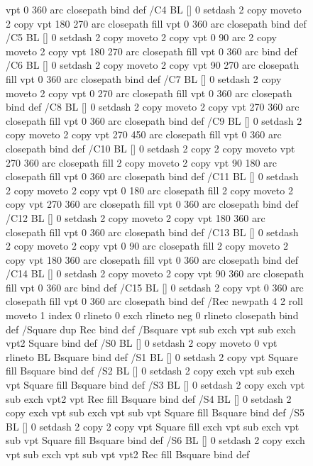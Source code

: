 \documentclass{LMCS}
\begin{document}
\begin{figure}[!tbp]
\begin{minipage}[b]{.47\linewidth}
{{{{               vpt 0 360 arc closepath } bind def
/C4 { BL [] 0 setdash 2 copy moveto
       2 copy  vpt 180 270 arc closepath fill
               vpt 0 360 arc closepath } bind def
/C5 { BL [] 0 setdash 2 copy moveto
       2 copy  vpt 0 90 arc
       2 copy moveto
       2 copy  vpt 180 270 arc closepath fill
               vpt 0 360 arc } bind def
/C6 { BL [] 0 setdash 2 copy moveto
      2 copy  vpt 90 270 arc closepath fill
              vpt 0 360 arc closepath } bind def
/C7 { BL [] 0 setdash 2 copy moveto
      2 copy  vpt 0 270 arc closepath fill
              vpt 0 360 arc closepath } bind def
/C8 { BL [] 0 setdash 2 copy moveto
      2 copy vpt 270 360 arc closepath fill
              vpt 0 360 arc closepath } bind def
/C9 { BL [] 0 setdash 2 copy moveto
      2 copy  vpt 270 450 arc closepath fill
              vpt 0 360 arc closepath } bind def
/C10 { BL [] 0 setdash 2 copy 2 copy moveto vpt 270 360 arc closepath fill
       2 copy moveto
       2 copy vpt 90 180 arc closepath fill
               vpt 0 360 arc closepath } bind def
/C11 { BL [] 0 setdash 2 copy moveto
       2 copy  vpt 0 180 arc closepath fill
       2 copy moveto
       2 copy  vpt 270 360 arc closepath fill
               vpt 0 360 arc closepath } bind def
/C12 { BL [] 0 setdash 2 copy moveto
       2 copy  vpt 180 360 arc closepath fill
               vpt 0 360 arc closepath } bind def
/C13 { BL [] 0 setdash  2 copy moveto
       2 copy  vpt 0 90 arc closepath fill
       2 copy moveto
       2 copy  vpt 180 360 arc closepath fill
               vpt 0 360 arc closepath } bind def
/C14 { BL [] 0 setdash 2 copy moveto
       2 copy  vpt 90 360 arc closepath fill
               vpt 0 360 arc } bind def
/C15 { BL [] 0 setdash 2 copy vpt 0 360 arc closepath fill
               vpt 0 360 arc closepath } bind def
/Rec   { newpath 4 2 roll moveto 1 index 0 rlineto 0 exch rlineto
       neg 0 rlineto closepath } bind def
/Square { dup Rec } bind def
/Bsquare { vpt sub exch vpt sub exch vpt2 Square } bind def
/S0 { BL [] 0 setdash 2 copy moveto 0 vpt rlineto BL Bsquare } bind def
/S1 { BL [] 0 setdash 2 copy vpt Square fill Bsquare } bind def
/S2 { BL [] 0 setdash 2 copy exch vpt sub exch vpt Square fill Bsquare } bind def
/S3 { BL [] 0 setdash 2 copy exch vpt sub exch vpt2 vpt Rec fill Bsquare } bind def
/S4 { BL [] 0 setdash 2 copy exch vpt sub exch vpt sub vpt Square fill Bsquare } bind def
/S5 { BL [] 0 setdash 2 copy 2 copy vpt Square fill
       exch vpt sub exch vpt sub vpt Square fill Bsquare } bind def
/S6 { BL [] 0 setdash 2 copy exch vpt sub exch vpt sub vpt vpt2 Rec fill Bsquare } bind def
}}}
\end{minipage}
\end{figure}
\end{document}
